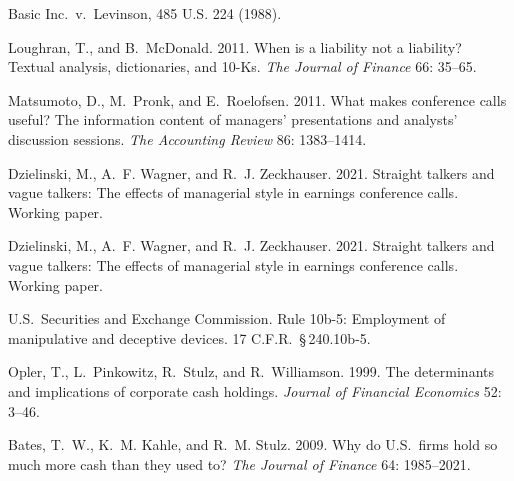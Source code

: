 %

Basic Inc.\ v.\ Levinson, 485 U.S. 224 (1988).

Loughran, T., and B.~McDonald. 2011. When is a liability not a liability? Textual analysis, dictionaries, and 10-Ks. \emph{The Journal of Finance} 66: 35--65.

Matsumoto, D., M.~Pronk, and E.~Roelofsen. 2011. What makes conference calls useful? The information content of managers' presentations and analysts' discussion sessions. \emph{The Accounting Review} 86: 1383--1414.

Dzielinski, M., A.~F. Wagner, and R.~J. Zeckhauser. 2021. Straight talkers and vague talkers: The effects of managerial style in earnings conference calls. Working paper. %

Dzielinski, M., A.~F. Wagner, and R.~J. Zeckhauser. 2021. Straight talkers and vague talkers: The effects of managerial style in earnings conference calls. Working paper. %

U.S.\ Securities and Exchange Commission. Rule 10b-5: Employment of manipulative and deceptive devices. 17 C.F.R.\ \S\,240.10b-5.

Opler, T., L.~Pinkowitz, R.~Stulz, and R.~Williamson. 1999. The determinants and implications of corporate cash holdings. \emph{Journal of Financial Economics} 52: 3--46. %

Bates, T.~W., K.~M. Kahle, and R.~M. Stulz. 2009. Why do U.S.\ firms hold so much more cash than they used to? \emph{The Journal of Finance} 64: 1985--2021. %

